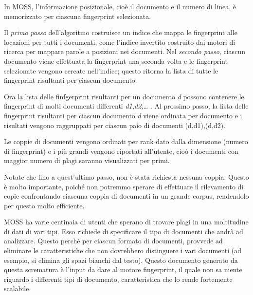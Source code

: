		In MOSS, l'informazione posizionale, cioè il documento e il numero di linea, è memorizzato per ciascuna fingerprint selezionata. 
		
		Il \textit{primo passo} dell'algoritmo costruisce un indice che mappa le fingerprint alle locazioni per tutti i documenti, come l'indice invertito costruito dai motori di ricerca per mappare parole a posizioni nei documenti.
		Nel \textit{secondo passo}, ciascun documento viene effettuata la fingerprint una seconda volta e le fingerprint selezionate vengono cercate nell'indice; questo ritorna la lista di tutte le fingerprint risultanti per ciascun documento. 
		
		Ora la lista delle finfgerprint risultanti per un documento \textit{d} possono contenere le fingerprint di molti documenti differenti \textit{ d1,d2,… }.
		Al prossimo passo, la lista delle fingerprint risultanti per ciascun documento \textit{d} viene ordinata per documento e i risultati vengono raggruppati per ciascun paio di documenti (d,d1),(d,d2). 
		
		Le coppie di documenti vengono ordinati per rank dato dalla dimensione (numero di fingerprint) e i più grandi vengono riportati all'utente, cioò i documenti con maggior numero di plagi saranno visualizzati per primi. 
		
		Notate che fino a quest'ultimo passo, non è stata richiesta nessuna coppia. 
		Questo è molto importante, poiché non potremmo sperare di effettuare il rilevamento di copie confrontando ciascuna coppia di documenti in un grande corpus, rendendolo per questo molto efficiente.

		MOSS ha varie centinaia di utenti che sperano di trovare plagi in una moltitudine di dati di vari tipi. Esso richiede di specificare il tipo di documenti che andrà ad analizzare. Questo perché per ciascun formato di documenti, provvede ad eliminare le caratteristiche che non dovrebbero distinguere i vari documenti (ad esempio, si elimina gli spazi bianchi dal testo). 
		Questo documento generato da questa scrematura è l'input da dare al motore fingerprint, il quale non sa niente riguardo i differenti tipi di documento, caratteristica che lo rende fortemente scalabile. 
	